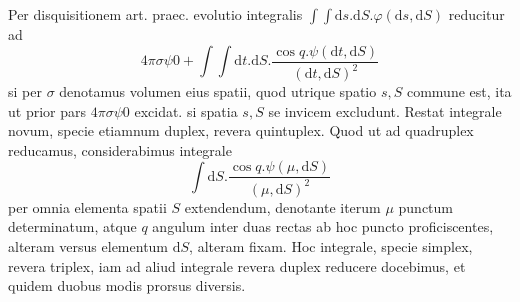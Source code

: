 Per disquisitionem art. praec. evolutio integralis $\int\int\mathrm{d}s.\mathrm{d}S.\varphi(\mathrm{d}s,\mathrm{d}S)$ reducitur ad
\[
4\pi\sigma\psi0+\int\int\mathrm{d}t.\mathrm{d}S.\frac{\cos q.\psi(\mathrm{d}t,\mathrm{d}S)}{(\mathrm{d}t,\mathrm{d}S)^2}
\]
si per $\sigma$ denotamus volumen eius spatii, quod utrique spatio $s,S$ commune est, ita ut prior pars $4\pi\sigma\psi0$ excidat. si spatia $s,S$ se invicem excludunt. Restat integrale novum, specie etiamnum duplex, revera quintuplex. Quod ut ad quadruplex reducamus, considerabimus integrale
\[
\int\mathrm{d}S.\frac{\cos q.\psi(\mu,\mathrm{d}S)}{(\mu,\mathrm{d}S)^2}
\]
per omnia elementa spatii $S$ extendendum, denotante iterum $\mu$ punctum determinatum, atque $q$ angulum inter duas rectas ab hoc puncto proficiscentes, alteram versus elementum $\mathrm{d}S$, alteram fixam. Hoc integrale, specie simplex, revera triplex, iam ad aliud integrale revera duplex reducere docebimus, et quidem duobus modis prorsus diversis.

